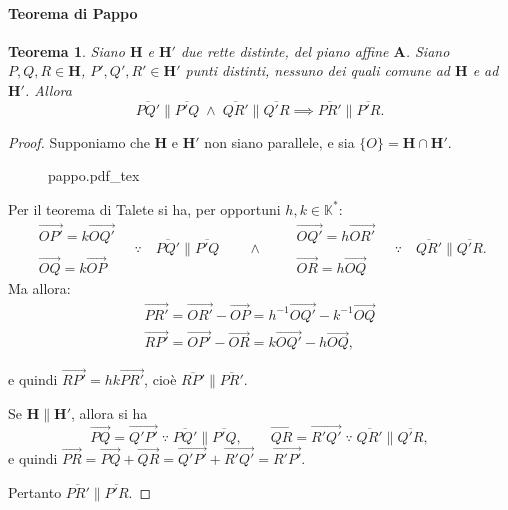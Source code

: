 \documentclass{article}
\theoremstyle{plain}
\newtheorem{thm}{Teorema}[section]
\theoremstyle{definition}
\theoremstyle{remark}
\newcommand{\incfig}[2][\columnwidth]{%
    \def\svgwidth{#1}
    {#2.pdf_tex}
}
\begin{document}
\paragraph{Teorema di Pappo}
\begin{bxthm}
\begin{thm}
    Siano $\mathbf{H}$ e $\mathbf{H}'$ due rette distinte, del piano affine $\mathbf{A}$. 
    Siano $P,Q,R \in \mathbf{H}$, $P',Q',R' \in \mathbf{H}'$ punti distinti, nessuno dei quali comune ad $\mathbf{H}$ e ad $\mathbf{H}'$. 
    Allora 
    \[\overline{PQ'} \parallel \overline{P'Q}\;\land\;\overline{QR'} \parallel \overline{Q'R}\implies\overline{PR'} \parallel \overline{P'R}.\]
\end{thm}
\end{bxthm}
\begin{proof}
Supponiamo che $\mathbf{H}$ e $\mathbf{H}'$ non siano parallele, e sia $\{O\} = \mathbf{H} \cap \mathbf{H}'$.
\begin{figure}[H]
    \centering
    \incfig[0.7\linewidth]{pappo}
\end{figure}
Per il teorema di Talete si ha, per opportuni $h,k \in \mathbb{K}^*$:
\[\begin{matrix}
    \overrightarrow{OP'} = k\overrightarrow{OQ'}\\\\
    \overrightarrow{OQ} = k\overrightarrow{OP}
\end{matrix}\quad\because\quad \overline{PQ'} \parallel \overline{P'Q} \quad\quad\land\quad\quad \begin{matrix}
\overrightarrow{OQ'} = h\overrightarrow{OR'}\\\\
\overrightarrow{OR} = h\overrightarrow{OQ}
\end{matrix}\quad\because\quad \overline{QR'} \parallel \overline{Q'R}.    \]
Ma allora:
\begin{align*}
\overrightarrow{PR'} = \overrightarrow{OR'} - \overrightarrow{OP} = h^{-1}\overrightarrow{OQ'} - k^{-1}\overrightarrow{OQ} \\
\overrightarrow{RP'} = \overrightarrow{OP'} - \overrightarrow{OR} = k\overrightarrow{OQ'} - h\overrightarrow{OQ},
\end{align*}

e quindi $\overrightarrow{RP'} = hk\overrightarrow{PR'}$, cioè $\overline{RP'} \parallel \overline{PR'}$.

Se $\mathbf{H} \parallel \mathbf{H}'$, allora si ha
\[\overrightarrow{PQ} = \overrightarrow{Q'P'}\;  \because\;  \overline{PQ'} \parallel \overline{P'Q}, \quad\quad\overrightarrow{QR} = \overrightarrow{R'Q'}  \;\because\;  \overline{QR'} \parallel \overline{Q'R},\]
e quindi
$\overrightarrow{PR} = \overrightarrow{PQ} + \overrightarrow{QR} = \overrightarrow{Q'P'} + \overrightarrow{R'Q'} = \overrightarrow{R'P'}.$

Pertanto $\overline{PR'} \parallel \overline{P'R}$.
\end{proof}
\end{document}
